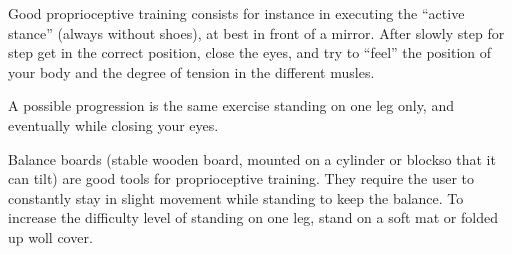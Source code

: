 \documentclass[../main.tex]{subfiles}
\begin{document}
Good proprioceptive training\label{Ex:Proprioceptive} consists for instance in executing the ``active stance'' (always without shoes), at best in front of a mirror.
After slowly step for step get in the correct position, close the eyes, and try to ``feel''  the position of your body and the degree of tension in the different musles.

A possible progression is the same exercise standing on one leg only, and eventually while closing your eyes.

Balance boards (stable wooden board, mounted on a cylinder or blockso that it can tilt) are good tools for proprioceptive training.
They require the user to constantly stay in slight movement while standing to keep the balance.
To increase the difficulty level of standing on one leg, stand on a soft mat   or folded up woll cover.
\end{document}
